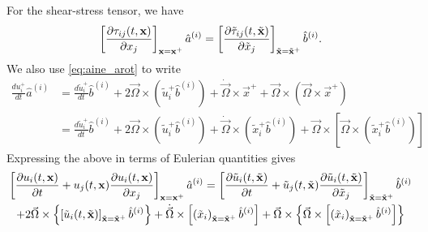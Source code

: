 \documentclass[oneside,a4paper,11pt]{report}
\begin{document}
For the shear-stress tensor, we have
\begin{equation}
    \label{eq:ns_shear_stress_rot_transform}
    \left [ \frac{\partial \tau_{ij}(t,\mathbf{x})}{\partial x_j} \right]_{\mathbf{x} = \mathbf{x}^+} \hat{a}^{(i)} = \left [ \frac{\partial \tilde{\tau}_{ij}(t,\tilde{\mathbf{x}})}{\partial \tilde{x}_j} \right]_{\tilde{\mathbf{x}} = \tilde{\mathbf{x}}^+} \hat{b}^{(i)}.
\end{equation}
We also use \cref{eq:aine_arot} to write
\begin{align}
    \frac{du_i^+}{dt} \hat{a}^{(i)} &= \frac{d\tilde{u}_i^+}{dt} \hat{b}^{(i)} + 2 \vec{\Omega} \times \left ( \tilde{u}_i^+ \hat{b}^{(i)} \right ) + \dot{\vec{\Omega}} \times \vec{x}^+ + \vec{\Omega} \times \left ( \vec{\Omega} \times \vec{x}^+ \right ) \nonumber \\
    &= \frac{d\tilde{u}_i^+}{dt} \hat{b}^{(i)} + 2 \vec{\Omega} \times \left ( \tilde{u}_i^+ \hat{b}^{(i)} \right ) + \dot{\vec{\Omega}} \times \left ( \tilde{x}_i^+ \hat{b}^{(i)}\right ) + \vec{\Omega} \times \left [ \vec{\Omega} \times \left ( \tilde{x}_i^+ \hat{b}^{(i)}\right ) \right ]
\end{align}
Expressing the above in terms of Eulerian quantities gives
\begin{multline}
    \label{eq:aine_arot_eulerian}
    \left [ \frac{\partial u_i(t,\mathbf{x})}{\partial t} + u_j(t,\mathbf{x}) \frac{\partial u_i(t,\mathbf{x})}{\partial x_j} \right ]_{\mathbf{x} = \mathbf{x}^+} \hat{a}^{(i)} = \left [ \frac{\partial \tilde{u}_i(t,\tilde{\mathbf{x}})}{\partial t} + \tilde{u}_j(t,\tilde{\mathbf{x}}) \frac{\partial \tilde{u}_i(t,\tilde{\mathbf{x}})}{\partial \tilde{x}_j} \right ]_{\tilde{\mathbf{x}} = \tilde{\mathbf{x}}^+} \hat{b}^{(i)} \\
    + 2 \vec{\Omega} \times \left \{ \left [\tilde{u}_i(t,\tilde{\mathbf{x}}) \right ]_{\tilde{\mathbf{x}} = \tilde{\mathbf{x}}^+} \hat{b}^{(i)} \right \} + \dot{\vec{\Omega}} \times \left [ \left ( \tilde{x}_i \right)_{\tilde{\mathbf{x}} = \tilde{\mathbf{x}}^+} \hat{b}^{(i)}\right ] + \vec{\Omega} \times \left \{ \vec{\Omega} \times \left [ \left ( \tilde{x}_i \right )_{\tilde{\mathbf{x}} = \tilde{\mathbf{x}}^+} \hat{b}^{(i)}\right ] \right \}
\end{multline}
\end{document}
